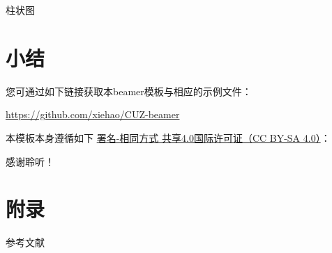 \documentclass[algorithm,pgfplots]{styles/cuzbeamer}
\begin{document}
    \begin{frame}
        \begin{block}{柱状图}
            \begin{figure}
            \end{figure}
        \end{block}
    \end{frame}

    \section{小结}

    \begin{frame}{}
        \begin{leftbar}
            您可通过如下链接获取本beamer模板与相应的示例文件：\par
            \begin{center}
                \href{https://github.com/xiehao/CUZ-beamer}{https://github.com/xiehao/CUZ-beamer}
            \end{center}
            本模板本身遵循如下
            \href{http://creativecommons.org/licenses/by-sa/4.0/}{署名-相同方式
            共享4.0国际许可证（CC BY-SA 4.0）}：
            \begin{center}
                \ccbysa
            \end{center}
        \end{leftbar}
    \end{frame}

    \begin{standout}[]
        感谢聆听！
    \end{standout}

    \appendix

    \section{附录}

    \begin{frame}[allowframebreaks]{参考文献}
        
        
    \end{frame}
\end{document}
